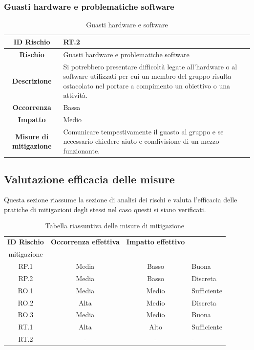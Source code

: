 \documentclass[10pt, a4paper]{article}
\begin{document}
\subsubsection{Guasti hardware e problematiche software}
\renewcommand{\arraystretch}{1.5}
\begin{table}[H]
\begin{tabularx}{\textwidth}{c|X}
\textbf{ID Rischio} & RT.2 \\
\hline
\textbf{Rischio} & Guasti hardware e problematiche software \\
\hline
\textbf{Descrizione} & Si potrebbero presentare difficoltà legate all’hardware o al software utilizzati per cui un membro del gruppo risulta ostacolato nel portare a compimento un obiettivo o una attività. \\
\hline
\textbf{Occorrenza} & Bassa \\
\hline
\textbf{Impatto} & Medio\\
\hline
\textbf{Misure di mitigazione} & Comunicare tempestivamente il guasto al gruppo e se necessario chiedere aiuto e condivisione di un mezzo funzionante.\\
\end{tabularx}
\caption{Guasti hardware e software}
\end{table}
\subsection{Valutazione efficacia delle misure}
Questa sezione riassume la sezione di analisi dei rischi e valuta l'efficacia delle pratiche di mitigazioni degli stessi nel caso questi si siano verificati.\\
\renewcommand{\arraystretch}{1.5}
\begin{table}[H]
\begin{tabularx}{\textwidth}{c|c|c|X}
\textbf{ID Rischio} & \textbf{Occorrenza effettiva} & \textbf{Impatto effettivo} & \textbf{\quantities{Efficacia misure di \\mitigazione}} \\
\hline
RP.1 & Media & Basso & Buona\\
\hline
RP.2 & Media & Basso & Discreta \\
\hline
RO.1 & Media & Medio & Sufficiente\\
\hline
RO.2 & Alta & Medio & Discreta\\
\hline
RO.3 & Media & Medio & Buona\\
\hline
RT.1 & Alta & Alto & Sufficiente\\
\hline
RT.2 & - & - & -\\


\end{tabularx}
\caption{Tabella riassuntiva delle misure di mitigazione}
\end{table}
\end{document}
